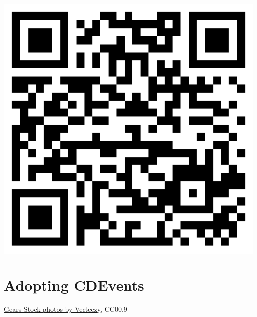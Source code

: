 \documentclass[aspectratio=169,11pt,hyperref={colorlinks=true}]{beamer}
\begin{document}
\begin{tpicstripedframe}
{\begin{textblock*}{0.17\paperwidth}
    \includegraphics[width=0.17\paperwidth]{img/cdevents-v4-release-announcement.png}
  \end{textblock*}
  }%
\end{tpicstripedframe}

\section{Adopting CDEvents}
\begin{sectionwithpiclargecentral}{\href{https://www.vecteezy.com/free-photos/gears}{\underline{Gears Stock photos by Vecteezy}}, CC0}{0.9}
\end{sectionwithpiclargecentral}
\end{document}
